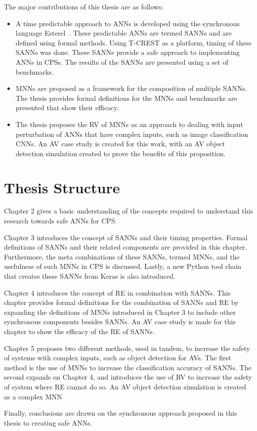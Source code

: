 The major contributions of this thesis are as follows:
\begin{itemize}
	\item A time predictable approach to \acp{ANN} is developed using the synchronous language Esterel~\cite{berry2000foundations}. These predictable \acp{ANN} are termed \acfp{SANN} and are defined using formal methods. Using T-CREST as a platform, timing of these \acp{SANN} was done. These \acp{SANN} provide a safe approach to implementing \acp{ANN} in \acp{CPS}. The results of the \acp{SANN} are presented using a set of benchmarks. 
	\item \acfp{MNN} are proposed as a framework for the composition of multiple \acp{SANN}. The thesis provides formal definitions for the \acp{MNN} and benchmarks are presented that show their efficacy. 
	\item The thesis proposes the \acf{RV} of \acp{MNN} as an approach to dealing with input perturbation of \acp{ANN} that have complex inputs, such as image classification \acfp{CNN}. An \acf{AV} case study is created for this work, with an \ac{AV} object detection simulation created to prove the benefits of this proposition. 
\end{itemize}

\section{Thesis Structure}
Chapter 2 gives a basic understanding of the concepts required to understand this research towards safe \acp{ANN} for \ac{CPS}.

Chapter 3 introduces the concept of \acfp{SANN} and their timing properties.
Formal definitions of \acp{SANN} and their related components are provided in this chapter.
Furthermore, the meta combinations of these \acp{SANN}, termed \acp{MNN}, and the usefulness of such \acp{MNN} in \ac{CPS} is discussed.
Lastly, a new Python tool chain that creates these \acp{SANN} from Keras is also introduced.

Chapter 4 introduces the concept of \acf{RE} in combination with \acp{SANN}. 
This chapter provides formal definitions for the combination of \acp{SANN} and \ac{RE} by expanding the definitions of \acp{MNN} introduced in Chapter 3 to include other synchronous components besides \acp{SANN}.
An \acf{AV} case study is made for this chapter to show the efficacy of the \ac{RE} of \acp{SANN}.

Chapter 5 proposes two different methods, used in tandem, to increase the safety of systems with complex inputs, such as object detection for \acp{AV}.
The first method is the use of \acp{MNN} to increase the classification accuracy of \acp{SANN}.
The second expands on Chapter 4, and introduces the use of \ac{RV} to increase the safety of system where \ac{RE} cannot do so.
An \ac{AV} object detection simulation is created as a complex \ac{MNN} 

Finally, conclusions are drawn on the synchronous approach proposed in this thesis to creating safe \acp{ANN}.

